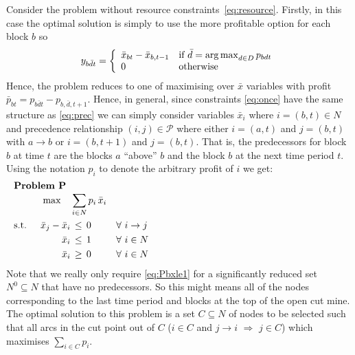 \documentclass[authoryear,11pt,square,number,times,super,comma]{elsarticle}
\def\bx{\bar{x}}
\DeclareMathOperator*{\argmax}{arg\,max}
\begin{document}
Consider the problem without resource constraints~\eqref{eq:resource}. Firstly,
in this case the optimal solution is simply to use the more profitable option
for each block $b$ so 
$$y_{b\bar dt}=\left \{ \begin{array}{ll}
                \bx_{bt}-\bx_{b,t-1} & \hbox{if }  \bar d=\argmax_{d\in D}p_{bdt}\\
                0 & \hbox{otherwise}
               \end{array} \right.
               $$
Hence, the problem reduces to one of maximising over $\bx$
variables with profit $\bar p_{bt} = p_{b\bar dt}-p_{b,\bar d,t+1}$.
Hence, in general, since constraints \eqref{eq:once} have the same structure as
\eqref{eq:prec} we can simply consider variables $\bx_i$ where $i=(b,t)\in N$ and
precedence relationship $(i,j)\in\mathcal{P}$ where either $i=(a,t)$ and
$j=(b,t)$ with $a\rightarrow b$ or $i=(b,t+1)$ and $j=(b,t)$. That is, the
predecessors for block $b$ at time $t$ are the blocks $a$ ``above'' $b$ and
the block $b$ at the next time period $t$. Using the notation $p_i$ to denote
the arbitrary profit of $i$ we get:
\begin{alignat}{3}   %
  \noalign{\noindent\bf Problem P}
  &&\max\quad&\sum_{i\in N} p_i\,\bx_i   & \label{eq:Pobj}\\
  \text{s.t. } && \bx_j - \bx_i &\,\leq\, 0&&\forall\ i\rightarrow j  \label{eq:Pprec}\\ 
  && \bx_i &\,\leq\, 1&& \forall\ i\in N\label{eq:Pbxle1}\\
  && \bx_i &\,\geq\, 0&& \forall\ i\in N\label{eq:Pxge0}
\end{alignat}
Note that we really only require \eqref{eq:Pbxle1} for a significantly reduced set
$N^{0}\subseteq N$ that have no predecessors. So this might means all of the
nodes corresponding to the last time period and blocks at the top of the open cut mine.
The optimal solution to this problem is a set $C\subseteq N$ of nodes to be
selected such that all arcs in the cut point out of $C$ ($i\in C$ and $j\rightarrow i$
$\Rightarrow$ $j\in C$) which maximises $\sum_{i\in C} p_i$.
\end{document}
